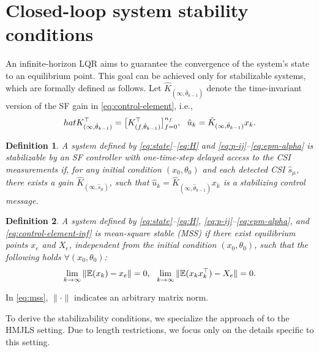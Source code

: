 \documentclass[letterpaper, 10 pt, conference]{ieeeconf}  %
\newtheorem{definition}{Definition}
\begin{document}
\section{Closed-loop system stability conditions}\label{sec:stability}
An infinite-horizon LQR aims to guarantee the convergence of the system's state to an equilibrium point. This goal can be achieved only for stabilizable systems, which are formally defined as follows. Let $\hat{K}_{(\infty,\hat{\theta}_{k-1})}$ denote the time-invariant version of the SF gain in \eqref{eq:control-element}, i.e.,
\begin{equation}\label{eq:control-element-inf}
	\text{\small $hat{K}_{(\infty,\hat{\theta}_{k-1})}^{\top} = \big[K_{(f,\hat{\theta}_{k-1})}^{\top}\big]_{f=0}^{n_f},~~
    \hat{u}_{k}=\hat{K}_{(\infty,\hat{\theta}_{k-1})}x_k.$}
\end{equation}
\begin{definition}\label{def:stabiliz} 
A system defined by \eqref{eq:state}--\eqref{eq:H} and \eqref{eq:p-ij}--\eqref{eq:epm-alpha} is stabilizable by %
an SF controller with one-time-step delayed access to the CSI measurements 
if, for any initial condition $(x_0,\theta_0)$ and each detected CSI $\hat{s}_{\mu}$, there exists a gain $\hat{K}_{(\infty,\hat{s}_{\mu})}$, such that  $\hat{u}_{k}=\hat{K}_{(\infty,\hat{\theta}_{k-1})}x_k$ is a stabilizing control message. %
\end{definition}
\begin{definition}\label{def:mss}
A system defined by \eqref{eq:state}--\eqref{eq:H}, \eqref{eq:p-ij}--\eqref{eq:epm-alpha}, and \eqref{eq:control-element-inf}
is mean-square stable (MSS) if there exist equilibrium points $x_{e}$ and $X_{e}$, independent from the initial condition $(x_0,\theta_0)$, such that the following holds $\forall (x_0,\theta_0)$:
\begin{equation}\label{eq:mss}
        \text{\small $\lim_{k \to \infty} \|\mathbb{E} (x_k)-x_{e} \| = 0,~~
        \lim_{k \to \infty} \|\mathbb{E} (x_k x_k^{\top} )-X_{e}\| = 0$}.
\end{equation}
\end{definition}
In \eqref{eq:mss}, $\|\cdot\|$ indicates an arbitrary matrix norm.

To derive the stabilizability conditions, we specialize the approach of \cite[Sec. 5]{yZL-2025-automatica} to the HMJLS setting. Due to length restrictions, we focus only on the details specific to this setting.
\end{document}
